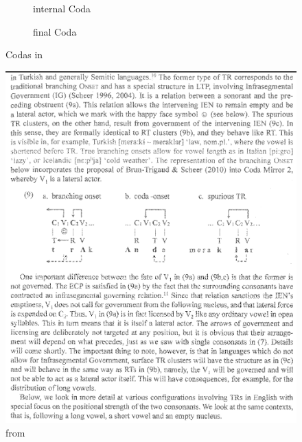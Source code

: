 \begin{figure}[h]
  \centering
  \begin{subfigure}{.49\textwidth}
    \centering
    \begin{structure}{}
      \emptyV[gov]
    \end{structure}
    \caption{internal Coda}
  \end{subfigure}
  \hfill
  \begin{subfigure}{.49\textwidth}
    \centering
    \begin{structure}{}
      \fen
    \end{structure}
    \caption{final Coda}
  \end{subfigure}
  \caption{Codas in \CVCV}
  \label{fig:intro:obj:coda}
\end{figure}

\begin{figure}
  \includegraphics{figures/note_phon_objects_coda_ig.png}
  \caption{from \cite[p.~12]{scheerCyran2017}}
\end{figure}

